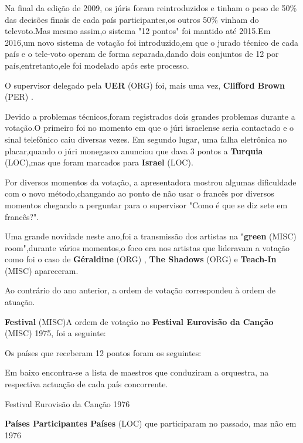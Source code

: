 \documentclass[12pt,a4paper]{article}
\begin{document}
Na final da edição de 2009, os júris foram reintroduzidos e tinham o peso de 50\% das decisões finais de cada país participantes,os outros 50\% vinham do televoto.Mas mesmo assim,o sistema "12 pontos" foi mantido até 2015.Em 2016,um novo sistema de votação foi introduzido,em que o jurado técnico de cada país e o tele-voto operam de forma separada,dando dois conjuntos de 12 por país,entretanto,ele foi modelado após este processo.

O supervisor delegado pela \textbf{UER} (ORG) foi, mais uma vez, \textbf{Clifford Brown} (PER) .

Devido a problemas técnicos,foram registrados dois grandes problemas durante a votação.O primeiro foi no momento em que o júri israelense seria contactado e o sinal telefônico caiu diversas vezes. Em segundo lugar, uma falha eletrônica no placar,quando o júri monegasco anunciou que dava 3 pontos a \textbf{Turquia} (LOC),mas que foram marcados para \textbf{Israel} (LOC).

Por diversos momentos da votação, a apresentadora mostrou algumas dificuldade com o novo método,changando ao ponto de não usar o francês por diversos momentos chegando a perguntar para o supervisor "Como é que se diz sete em francês?".

Uma grande novidade neste ano,foi a transmissão dos artistas na "\textbf{green} (MISC) room",durante vários momentos,o foco era nos artistas que lideravam a votação como foi o caso de \textbf{Géraldine} (ORG) , \textbf{The Shadows} (ORG) e \textbf{Teach-In} (MISC) apareceram.

Ao contrário do ano anterior, a ordem de votação correspondeu à ordem de atuação.



\textbf{Festival} (MISC)A ordem de votação no \textbf{Festival Eurovisão da Canção} (MISC) 1975, foi a seguinte:

Os países que receberam 12 pontos foram os seguintes:

Em baixo encontra-se a lista de maestros que conduziram a orquestra, na respectiva actuação de cada país concorrente.



Festival Eurovisão da Canção 1976



\textbf{Países Participantes Países} (LOC) que participaram no passado, mas não em 1976
\end{document}
